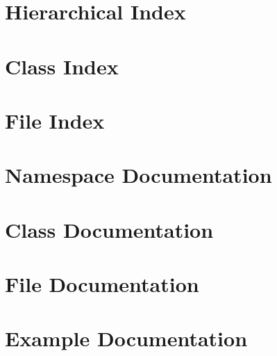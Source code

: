 \documentclass[twoside]{book}
\newcommand{\+}{\discretionary{\mbox{\scriptsize$\hookleftarrow$}}{}{}}
\newcommand{\clearemptydoublepage}{%
  \newpage{\pagestyle{empty}\cleardoublepage}%
}
\begin{document}
\chapter{Hierarchical Index}

\chapter{Class Index}

\chapter{File Index}

\chapter{Namespace Documentation}





\chapter{Class Documentation}












\chapter{File Documentation}








\chapter{Example Documentation}












\backmatter
\newpage
{}
\clearemptydoublepage
{}
\printindex
\end{document}
